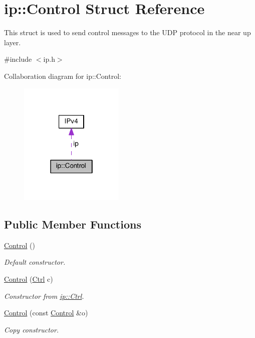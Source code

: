 \hypertarget{structip_1_1Control}{}\section{ip\+:\+:Control Struct Reference}
\label{structip_1_1Control}


This struct is used to send control messages to the U\+DP protocol in the near up layer.  




{\ttfamily \#include $<$ip.\+h$>$}



Collaboration diagram for ip\+:\+:Control\+:\nopagebreak
\begin{figure}[H]
\begin{center}
\leavevmode
\includegraphics[width=142pt]{structip_1_1Control__coll__graph}
\end{center}
\end{figure}
\subsection*{Public Member Functions}
\begin{DoxyCompactItemize}
\item 
\hyperlink{structip_1_1Control_a0face8d8ee8eb1362440a04f9a6ce4a5}{Control} ()
\begin{DoxyCompactList}\small\item\em Default constructor. \end{DoxyCompactList}\item 
\hyperlink{structip_1_1Control_a32ecd23afdfd205d5b7c7fb780f918ae}{Control} (\hyperlink{namespaceip_a341d8827cf57ab044a78c05922bea473}{Ctrl} c)
\begin{DoxyCompactList}\small\item\em Constructor from \hyperlink{namespaceip_a341d8827cf57ab044a78c05922bea473}{ip\+::\+Ctrl}. \end{DoxyCompactList}\item 
\hyperlink{structip_1_1Control_a082e14e4b06f64d456fb417656ec5f73}{Control} (const \hyperlink{structip_1_1Control}{Control} \&o)
\begin{DoxyCompactList}\small\item\em Copy constructor. \end{DoxyCompactList}\end{DoxyCompactItemize}
